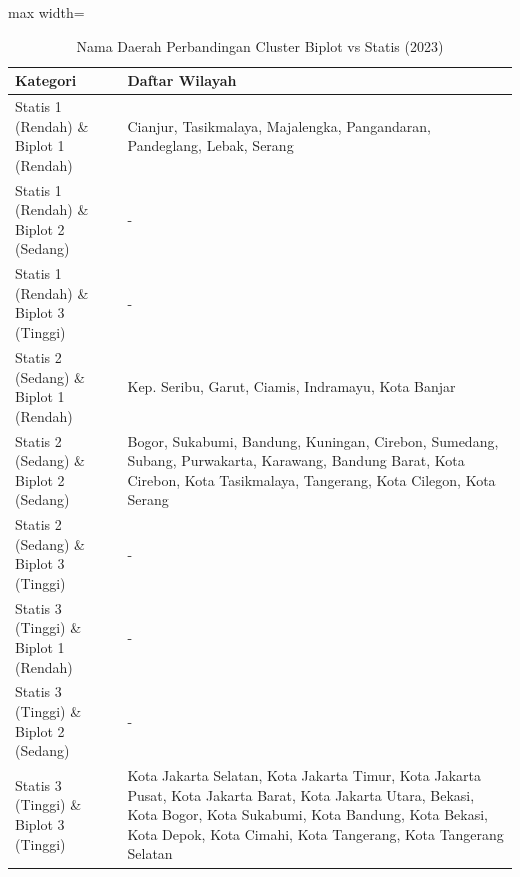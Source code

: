 \begin{table}[H]
\centering
\caption{Nama Daerah Perbandingan Cluster Biplot vs Statis (2023)} \label{tab:appbiplot_statis_name_2023}
\begin{adjustbox}{max width=\textwidth}
\begin{tabular}{|p{4cm}|p{10cm}|}
\hline
\textbf{Kategori} & \textbf{Daftar Wilayah} \\
\hline
Statis 1 (Rendah) \& Biplot 1 (Rendah) & Cianjur, Tasikmalaya, Majalengka, Pangandaran, Pandeglang, Lebak, Serang \\
\hline
Statis 1 (Rendah) \& Biplot 2 (Sedang) & - \\
\hline
Statis 1 (Rendah) \& Biplot 3 (Tinggi) & - \\
\hline
Statis 2 (Sedang) \& Biplot 1 (Rendah) & Kep. Seribu, Garut, Ciamis, Indramayu, Kota Banjar \\
\hline
Statis 2 (Sedang) \& Biplot 2 (Sedang) & Bogor, Sukabumi, Bandung, Kuningan, Cirebon, Sumedang, Subang, Purwakarta, Karawang, Bandung Barat, Kota Cirebon, Kota Tasikmalaya, Tangerang, Kota Cilegon, Kota Serang \\
\hline
Statis 2 (Sedang) \& Biplot 3 (Tinggi) & - \\
\hline
Statis 3 (Tinggi) \& Biplot 1 (Rendah) & - \\
\hline
Statis 3 (Tinggi) \& Biplot 2 (Sedang) & - \\
\hline
Statis 3 (Tinggi) \& Biplot 3 (Tinggi) & Kota Jakarta Selatan, Kota Jakarta Timur, Kota Jakarta Pusat, Kota Jakarta Barat, Kota Jakarta Utara, Bekasi, Kota Bogor, Kota Sukabumi, Kota Bandung, Kota Bekasi, Kota Depok, Kota Cimahi, Kota Tangerang, Kota Tangerang Selatan \\
\hline
\end{tabular}
\end{adjustbox}
\end{table}